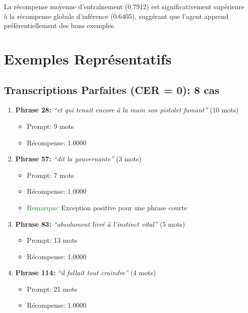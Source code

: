 \documentclass[12pt,a4paper]{article}
\begin{document}
La récompense moyenne d'entraînement (0.7912) est significativement supérieure à la récompense globale d'inférence (0.6405), suggérant que l'agent apprend préférentiellement des bons exemples.

\section{Exemples Représentatifs}

\subsection{Transcriptions Parfaites (CER = 0): 8 cas}

\begin{enumerate}
    \item \textbf{Phrase 28:} \textit{``et qui tenait encore à la main son pistolet fumant''} (10 mots)
    \begin{itemize}
        \item Prompt: 9 mots
        \item Récompense: 1.0000
    \end{itemize}
    
    \item \textbf{Phrase 57:} \textit{``dit la gouvernante''} (3 mots)
    \begin{itemize}
        \item Prompt: 7 mots
        \item Récompense: 1.0000
        \item \textcolor{green}{Remarque:} Exception positive pour une phrase courte
    \end{itemize}
    
    \item \textbf{Phrase 83:} \textit{``absolument livré à l'instinct vital''} (5 mots)
    \begin{itemize}
        \item Prompt: 13 mots
        \item Récompense: 1.0000
    \end{itemize}
    
    \item \textbf{Phrase 114:} \textit{``il fallait tout craindre''} (4 mots)
    \begin{itemize}
        \item Prompt: 21 mots
        \item Récompense: 1.0000
    \end{itemize}
\end{enumerate}
\end{document}
